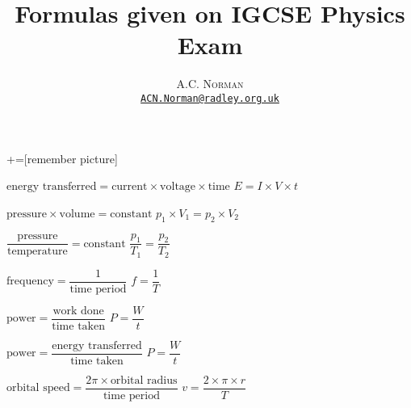 \documentclass[12pt,a4paper]{article}
\title{Formulas given on IGCSE Physics Exam}
\author{\textsc{A.C. Norman}
\\ \href{mailto:ACN.Norman@radley.org.uk}{\texttt{ACN.Norman@radley.org.uk}} }
\date{}
\begin{document}
\maketitle

+=[remember picture]


\noindent\begin{paracol}{2}
$\text{energy transferred}=\text{current}\times\text{voltage}\times\text{time}$
\switchcolumn
$E=I\times V\times t$\\
\end{paracol}

\noindent\begin{paracol}{2}
$\text{pressure}\times\text{volume}=\text{constant}$
\switchcolumn
$p_{1}\times V_{1}=p_{2}\times V_{2}$\\
\end{paracol}

\noindent\begin{paracol}{2}
$\dfrac{\text{pressure}}{\text{temperature}}=\text{constant}$
\switchcolumn
$\dfrac{p_{1}}{T_{1}}=\dfrac{p_{2}}{T_{2}}$\\
\end{paracol}

\noindent\begin{paracol}{2}
$\text{frequency}=\dfrac{1}{\text{time period}}$
\switchcolumn
$f=\dfrac{1}{T}$\\
\end{paracol}

\vspace{0.5em}

\noindent\begin{paracol}{2}
$\text{power}=\dfrac{\text{work done}}{\text{time taken}}$
\switchcolumn
$P=\dfrac{W}{t}$\\
\end{paracol}

\vspace{0.5em}

\noindent\begin{paracol}{2}
$\text{power}=\dfrac{\text{energy transferred}}{\text{time taken}}$
\switchcolumn
$P=\dfrac{W}{t}$\\
\end{paracol}

\vspace{0.5em}

\noindent\begin{paracol}{2}
$\text{orbital speed}=\dfrac{2\pi\times\text{orbital radius}}{\text{time period}}$
\switchcolumn
$v=\dfrac{2\times\pi\times r}{T}$\\
\end{paracol}
\end{document}
